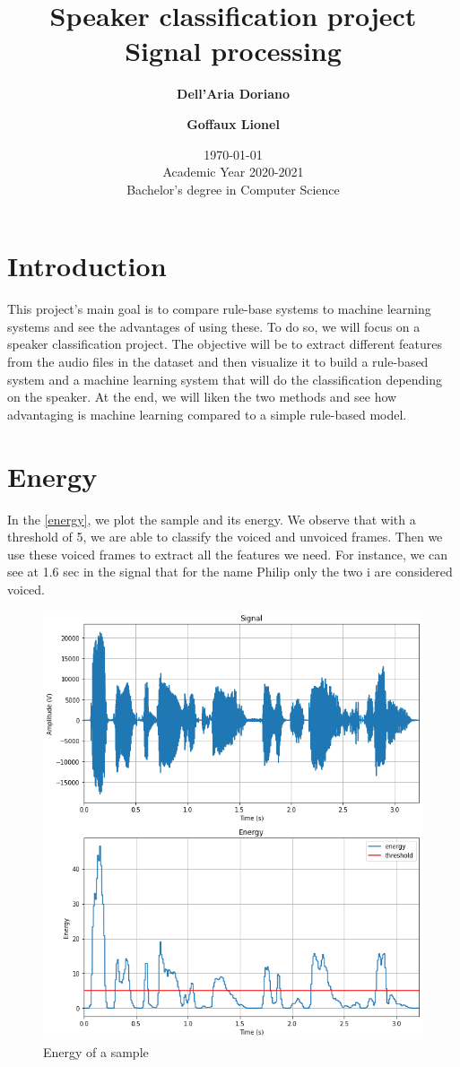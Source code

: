\documentclass[]{article}
\title{
{\Huge Speaker classification project}\\
Signal processing\\
}
\author{
\textbf{Dell’Aria Doriano}
\and
\textbf{Goffaux Lionel}\\
}
\date{\today\\
Academic Year 2020-2021\\
Bachelor's degree in Computer Science\\}
\begin{document}
\maketitle
\pagebreak

\tableofcontents
\pagebreak

\section{Introduction}
This project's main goal is to compare rule-base systems to machine learning systems and see
the advantages of using these. To do so, we will focus on a speaker classification project.
The objective will be to extract different features from the audio files in the dataset and
then visualize it to build a rule-based system and a machine learning system that will do
the classification depending on the speaker. At the end, we will liken the two methods
and see how advantaging is machine learning compared to a simple rule-based model.

\section{Energy}
In the \autoref{energy}, we plot the sample and its energy. We observe that with a threshold of 5,
we are able to classify the voiced and unvoiced frames.
Then we use these voiced frames to extract all the features we need.
For instance, we can see at 1.6 sec in the signal that for the name Philip only the two i are
considered voiced. 


\begin{figure}[H]
    \centering
    \caption{\label{energy}Energy of a sample}
    \includegraphics[scale=0.5]{images/energy_threshold.png}
\end{figure}
\end{document}
